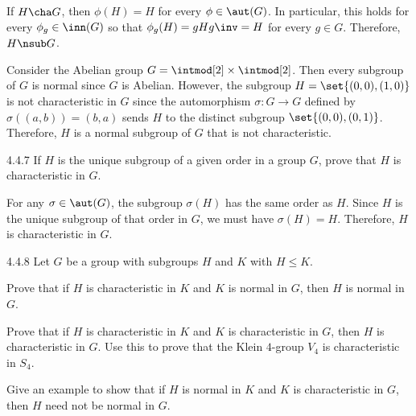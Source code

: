 \begin{sol}
	If $H \cha G$, then $\phi(H) = H$ for every $\phi \in \aut(G)$.
	In particular, this holds for every $\phi_g \in \inn(G)$ so that $\phi_g(H) = gHg\inv = H$ for every $g \in G$.
	Therefore, $H \nsub G$.

	Consider the Abelian group $G = \intmod[2] \times \intmod[2]$.
	Then every subgroup of $G$ is normal since $G$ is Abelian.
	However, the subgroup $H = \set{(0,0), (1,0)}$ is not characteristic in $G$ since the automorphism $\sigma : G \to G$ defined by $\sigma((a,b)) = (b,a)$ sends $H$ to the distinct subgroup $\set{(0,0), (0,1)}$.
	Therefore, $H$ is a normal subgroup of $G$ that is not characteristic.
\end{sol}

\begin{exercise}{4.4.7} 
	If $H$ is the unique subgroup of a given order in a group $G$, prove that $H$ is characteristic in $G$.
\end{exercise}

\begin{sol}
	For any $\sigma \in \aut(G)$, the subgroup $\sigma(H)$ has the same order as $H$.
	Since $H$ is the unique subgroup of that order in $G$, we must have $\sigma(H) = H$.
	Therefore, $H$ is characteristic in $G$.
\end{sol}

\begin{spex}{4.4.8}
	Let $G$ be a group with subgroups $H$ and $K$ with $H \le K$.
	\begin{subexercises}
		\item Prove that if $H$ is characteristic in $K$ and $K$ is normal in $G$, then $H$ is normal in $G$.
		\item Prove that if $H$ is characteristic in $K$ and $K$ is characteristic in $G$, then $H$ is characteristic in $G$.
		Use this to prove that the Klein $4$-group $V_4$ is characteristic in $S_4$.
		\item Give an example to show that if $H$ is normal in $K$ and $K$ is characteristic in $G$, then $H$ need not be normal in $G$.
	\end{subexercises}
\end{spex}

